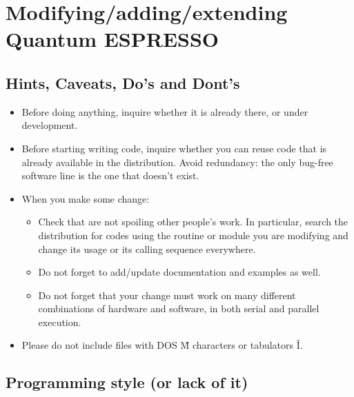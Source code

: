 \documentclass[12pt,a4paper]{article}
\begin{document}
\section{ Modifying/adding/extending Quantum ESPRESSO}
\subsection{Hints, Caveats, Do's and Dont's}

\begin{itemize}
\item Before doing anything, inquire whether it is already there, or under development.
\item Before starting writing code, inquire whether you can reuse code that is already available in the distribution. Avoid redundancy: the only bug-free software line is the one that doesn't exist.
\item When you make some change:
\begin{itemize}
\item Check that are not spoiling other people's work. In particular, search the distribution for codes using the routine or module you are modifying and change its usage or its calling sequence everywhere.
\item Do not forget to add/update documentation and examples as well.
\item Do not forget that your change must work on many different combinations of hardware and software, in both serial and parallel execution.
\end{itemize}
\item Please do not include files with DOS \^M characters or 
tabulators \^I.
\end{itemize}

\subsection{Programming style (or lack of it)}
\end{document}
